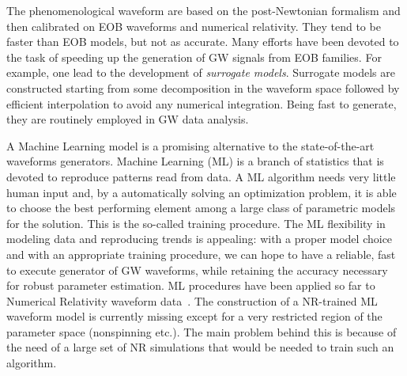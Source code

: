 The phenomenological waveform are based on the post-Newtonian formalism and then calibrated on EOB waveforms and numerical relativity. 
They tend to be faster than EOB models, but not as accurate.
Many efforts have been devoted to the task of speeding up the generation of GW signals from EOB families.
For example, one lead to the development of \textit{surrogate models}. Surrogate models are constructed 
starting from some decomposition in the waveform space followed by efficient interpolation to avoid any  numerical integration. 
Being fast to generate, they are routinely employed in GW data analysis. 
\par
A Machine Learning model is a promising alternative to the state-of-the-art waveforms generators. Machine Learning (ML) is a branch 
of statistics that is devoted to reproduce patterns read from data. A ML algorithm needs very little human input and, by a automatically solving an optimization problem, it is able to choose the best performing element among a large class of parametric models for the solution. This is the so-called training procedure. 
The ML flexibility in modeling data and reproducing trends is appealing: with a proper model choice and with an appropriate training 
procedure, we can hope to have a reliable, fast to execute generator of GW waveforms, while retaining the accuracy necessary for robust parameter estimation.
ML procedures have been applied so far to Numerical Relativity waveform data~\cite{Gabbard:2017lja,George:2017pmj,George:2017vlv,Rebei:2018lzh,Khan:2020foe}.
The construction of a NR-trained ML waveform model is currently missing except for a very restricted region of
the parameter space (nonspinning etc.). The main problem behind this is because of the need of a large set of
NR simulations that would be needed to train such an algorithm.

